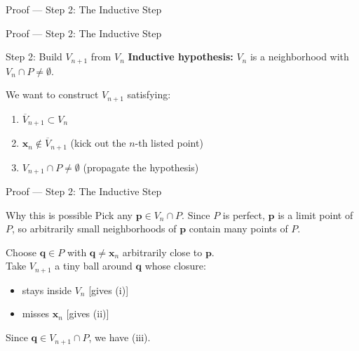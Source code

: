 \documentclass[aspectratio=169,12pt,t]{beamer}
\begin{document}
{\begin{frame}{Proof --- Step 2: The Inductive Step}
\end{frame}

\begin{frame}{Proof --- Step 2: The Inductive Step}
  \begin{proofblock}{Step 2: Build $V_{n+1}$ from $V_n$}
    \textbf{Inductive hypothesis:} $V_n$ is a neighborhood with $V_n \cap P \neq \emptyset$.
  \end{proofblock}

  \vspace{0.6em}
  \begin{hlbox}
    We want to construct $V_{n+1}$ satisfying:
    \begin{enumerate}
      \item[(i)] $\overline{V}_{n+1} \subset V_n$
      \item[(ii)] $\mathbf{x}_n \notin \overline{V}_{n+1}$ \quad \alert{(kick out the $n$-th listed point)}
      \item[(iii)] $V_{n+1} \cap P \neq \emptyset$ \quad \alert{(propagate the hypothesis)}
    \end{enumerate}
  \end{hlbox}

\end{frame}

\begin{frame}{Proof --- Step 2: The Inductive Step}
  \begin{proofblock}{Why this is possible}
    Pick any $\mathbf{p} \in V_n \cap P$. Since $P$ is \alert{perfect}, $\mathbf{p}$ is a limit point of $P$, so arbitrarily small neighborhoods of $\mathbf{p}$ contain many points of $P$.
  \end{proofblock}

  \vspace{0.5em}
  \begin{hlbox}
    Choose $\mathbf{q} \in P$ with $\mathbf{q} \neq \mathbf{x}_n$ arbitrarily close to $\mathbf{p}$.\\
    Take $V_{n+1}$ a tiny ball around $\mathbf{q}$ whose closure:
    \begin{itemize}
      \item stays inside $V_n$ \hfill [gives (i)]
      \item misses $\mathbf{x}_n$ \hfill [gives (ii)]
    \end{itemize}
    Since $\mathbf{q} \in V_{n+1} \cap P$, we have (iii).
  \end{hlbox}


\end{frame}}
\end{document}

